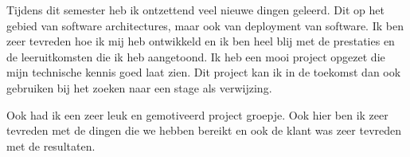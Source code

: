 

Tijdens dit semester heb ik ontzettend veel nieuwe dingen geleerd.
Dit op het gebied van software architectures, maar ook van deployment van software.
Ik ben zeer tevreden hoe ik mij heb ontwikkeld en ik ben heel blij met de prestaties en de leeruitkomsten die ik heb aangetoond.
Ik heb een mooi project opgezet die mijn technische kennis goed laat zien.
Dit project kan ik in de toekomst dan ook gebruiken bij het zoeken naar een stage als verwijzing.

Ook had ik een zeer leuk en gemotiveerd project groepje.
Ook hier ben ik zeer tevreden met de dingen die we hebben bereikt en ook de klant was zeer tevreden met de resultaten.